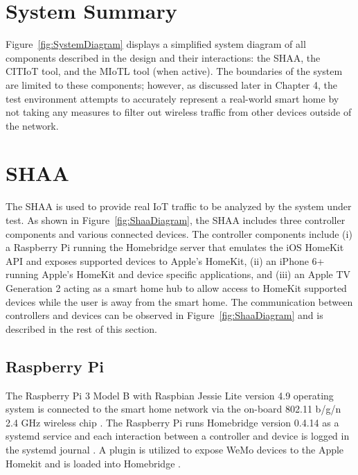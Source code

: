 \documentclass[12pt,letterpaper,oneside]{book}
\begin{document}
		\section{System Summary}
		
		Figure~\ref{fig:SystemDiagram} displays a simplified system diagram of all components described in the design and their interactions: the \ac{SHAA}, the \ac{CITIoT} tool, and the \ac{MIoTL} tool (when active). The boundaries of the system are limited to these components; however, as discussed later in Chapter 4, the test environment attempts to accurately represent a real-world smart home by not taking any measures to filter out wireless traffic from other devices outside of the network. 
		
		\figSystemDiagram
		
		\section{\acf{SHAA}}
		
		The \ac{SHAA} is used to provide real \ac{IoT} traffic to be analyzed by the system under test. As shown in Figure~\ref{fig:ShaaDiagram}, the \ac{SHAA} includes three controller components and various connected devices. The controller components include (i) a Raspberry Pi running the Homebridge server that emulates the iOS HomeKit \ac{API} and exposes supported devices to Apple's HomeKit, (ii) an iPhone 6+ running Apple's HomeKit and device specific applications, and (iii) an Apple TV Generation 2 acting as a smart home hub to allow access to HomeKit supported devices while the user is away from the smart home. The communication between controllers and devices can be observed in Figure~\ref{fig:ShaaDiagram} and is described in the rest of this section.
		
		\figShaaDiagram
			
			\subsection{Raspberry Pi}
			
			The Raspberry Pi 3 Model B with Raspbian Jessie Lite version 4.9 operating system is connected to the smart home network via the on-board 802.11 b/g/n 2.4 GHz wireless chip \cite{rasbperry}. The Raspberry Pi runs Homebridge version 0.4.14 as a systemd service and each interaction between a controller and device is logged in the systemd journal \cite{homebridge}. \done{} A plugin is utilized to expose WeMo devices to the Apple Homekit and is loaded into Homebridge \cite{wemo}.
			
\end{document}
